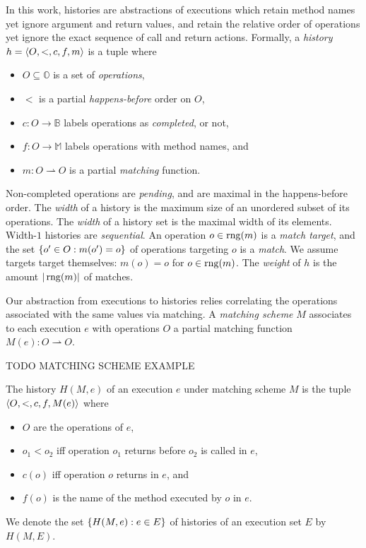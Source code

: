 In this work, histories are abstractions of executions which retain method
names yet ignore argument and return values, and retain the relative order of
operations yet ignore the exact sequence of call and return actions. Formally,
a \emph{history} $h = {\left\langle{O,<,c,f,m}\right\rangle}$ is a tuple where
\begin{itemize}

  \item $O \subseteq \mathbb{O}$ is a set of \emph{operations},

  \item $<$ is a partial \emph{happens-before} order on $O$,

  \item $c: O \to \mathbb{B}$ labels operations as \emph{completed}, or not,

  \item $f: O \to \mathbb{M}$ labels operations with method names, and

  \item $m: O \rightharpoonup O$ is a partial \emph{matching} function.

\end{itemize}
Non-completed operations are \emph{pending}, and are maximal in the
happens-before order. The \emph{width} of a history is the maximum size of an
unordered subset of its operations. The \emph{width} of a history set is the
maximal width of its elements. Width-$1$ histories are \emph{sequential}. An
operation $o \in \operatorname{rng}(m)$ is a \emph{match target}, and the set ${\{{ o' \in O
: m(o') = o}\}}$ of operations targeting $o$ is a \emph{match}. We assume targets
target themselves: $m(o) = o$ for $o \in \operatorname{rng}(m)$. The \emph{weight} of $h$ is
the amount $|\operatorname{rng}(m)|$ of matches.

Our abstraction from executions to histories relies correlating the operations
associated with the same values via matching. A \emph{matching scheme} $M$
associates to each execution $e$ with operations $O$ a partial matching
function $M(e): O \rightharpoonup O$.

\begin{example}

  TODO MATCHING SCHEME EXAMPLE

\end{example}

The history $H(M,e)$ of an execution $e$ under matching scheme $M$ is the tuple
${\left\langle{O,<,c,f,M(e)}\right\rangle}$ where
\begin{itemize}

  \item $O$ are the operations of $e$,

  \item $o_1 < o_2$ if{f} operation $o_1$ returns before $o_2$ is called in $e$,

  \item $c(o)$ if{f} operation $o$ returns in $e$, and

  \item $f(o)$ is the name of the method executed by $o$ in $e$.

\end{itemize}
We denote the set ${\{{H(M,e) : e \in E}\}}$ of histories of an execution set $E$
by $H(M,E)$.

